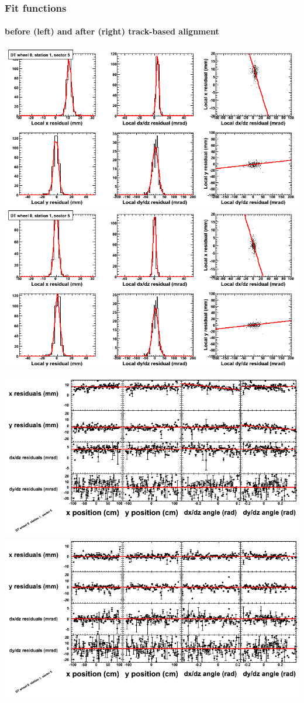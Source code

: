 \documentclass[compress]{beamer}
\begin{document}
\begin{frame}
\frametitle{Fit functions}
\framesubtitle{before (left) and after (right) track-based alignment}
\includegraphics[width=0.5\linewidth]{fitfunctions_re01/MBwhCst1sec05_bellcurves.png} \includegraphics[width=0.5\linewidth]{fitfunctions_re05/MBwhCst1sec05_bellcurves.png}

\includegraphics[width=0.5\linewidth]{fitfunctions_re01/MBwhCst1sec05_polynomials.png} \includegraphics[width=0.5\linewidth]{fitfunctions_re05/MBwhCst1sec05_polynomials.png}
\end{frame}
\end{document}
